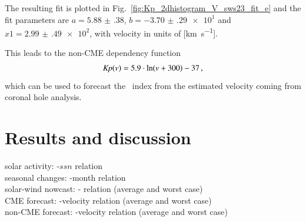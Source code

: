 The resulting fit is plotted in Fig.~\ref{fig:Kp_2dhistogram_V_sws23_fit_e} and the fit parameters are $a = \num{5.88(38)}$, $b = \num{-3.70(29)e1}$ and $x1 = \num{2.99(49)e2}$, with velocity in units of [\si{\km\per\s}].\\
\begin{figure}
\end{figure}
This leads to the non-CME dependency function
\begin{align}
	\textit{Kp}(v) = 5.9 \cdot \ln(v + 300) - 37	\,,	\label{eq:kpvsv_sws23_dependency_function}
\end{align}
which can be used to forecast the \Kp{}~index from the estimated velocity coming from coronal hole analysis.\\


\section{Results and discussion}
solar activity: \Kp-$ssn$ relation\\
seasonal changes: \Kp{}-month relation\\
solar-wind nowcast: \Kp-\vBz{} relation (average and worst case)\\
CME forecast: \Kp-velocity relation (average and worst case)\\
non-CME forecast: \Kp-velocity relation (average and worst case)\\

